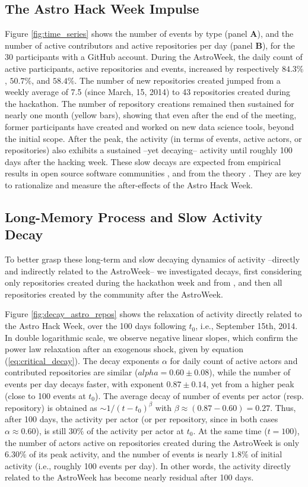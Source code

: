 \subsection{The Astro Hack Week Impulse}
Figure \ref{fig:time_series} shows the number of events by type (panel {\bf A}), and the number of active contributors and active repositories per day (panel {\bf B}), for the 30 participants with a GitHub account. During the AstroWeek, the daily count of active participants, active repositories and events, increased by respectively $84.3\%$, $50.7\%$, and $58.4\%$. The number of new repositories created jumped from a weekly average of 7.5 (since March, 15, 2014) to 43 repositories created during the hackathon. The number of repository creations remained then sustained for nearly one month (yellow bars), showing that even after the end of the meeting, former participants have created and worked on new data science tools, beyond the initial scope. After the peak, the activity (in terms of events, active actors, or repositories) also exhibits a sustained --yet decaying-- activity until roughly 100 days after the hacking week. These slow decays are expected from empirical results in open source software communities \cite{sornette2014much}, and from the theory \cite{saichev2013hierarchy}. They are key to rationalize and measure the after-effects of the Astro Hack Week.


\subsection{Long-Memory Process and Slow Activity Decay}
To better grasp these long-term and slow decaying dynamics of activity --directly and indirectly related to the AstroWeek-- we investigated decays, first considering only repositories created during the hackathon week \cite{astro_hackpad} and from \cite{astro_github}, and then all repositories created by the community after the AstroWeek.

Figure \ref{fig:decay_astro_repos} shows the relaxation of activity directly related to the Astro Hack Week, over the 100 days following $t_0$, i.e., September 15th, 2014. In double logarithmic scale, we observe negative linear slopes, which confirm the power law relaxation after an exogenous shock, given by equation (\ref{eq:critical_decay}). The decay exponents $\alpha$ for daily count of active actors and contributed repositories are similar ($alpha = 0.60\pm0.08$), while the number of events per day decays faster, with exponent $0.87\pm0.14$, yet from a higher peak (close to 100 events at $t_0$). The average decay of number of events per actor (resp. repository) is obtained as $\sim 1/(t-t_0)^{\beta}$ with $\beta \approx (0.87 - 0.60) = 0.27$. Thus, after 100 days, the activity per actor (or per repository, since in both cases $\alpha \approx 0.60$), is still $30\%$ of the activity per actor at $t_0$. At the same time ($t=100$), the number of actors active on repositories created during the AstroWeek is only $6.30\%$ of its peak activity, and the number of events is nearly $1.8\%$ of initial activity (i.e., roughly 100 events per day). In other words, the activity directly related to the AstroWeek has become nearly residual after 100 days.

